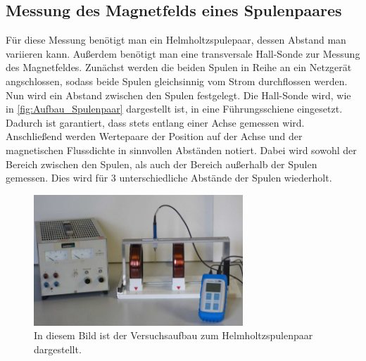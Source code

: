\subsection{Messung des Magnetfelds eines Spulenpaares}
\label{subsec:D_Spulenpaar}
Für diese Messung benötigt man ein Helmholtzspulepaar, dessen Abstand man variieren kann. Außerdem benötigt man eine transversale Hall-Sonde zur Messung des Magnetfeldes. Zunächst
werden die beiden Spulen in Reihe an ein Netzgerät angschlossen, sodass beide Spulen gleichsinnig vom Strom durchflossen werden. Nun wird ein Abstand zwischen den Spulen 
festgelegt. Die Hall-Sonde wird, wie in \autoref{fig:Aufbau_Spulenpaar} dargestellt ist, in eine Führungsschiene eingesetzt. Dadurch ist garantiert, dass stets entlang einer Achse
gemessen wird.
Anschließend werden Wertepaare der Position auf der Achse und der magnetischen Flussdichte in sinnvollen Abständen notiert. Dabei wird sowohl der Bereich zwischen den Spulen, 
als auch der Bereich außerhalb der Spulen gemessen. Dies wird für 3 unterschiedliche Abstände der Spulen wiederholt.
\begin{figure}
    \centering
    \caption{In diesem Bild ist der Versuchsaufbau zum Helmholtzspulenpaar dargestellt.\cite{v308}}
    \label{fig:Aufbau_Spulenpaar}
    \includegraphics[width=0.7\textwidth]{content/HelmHoltzAufbau.PNG}
\end{figure}
